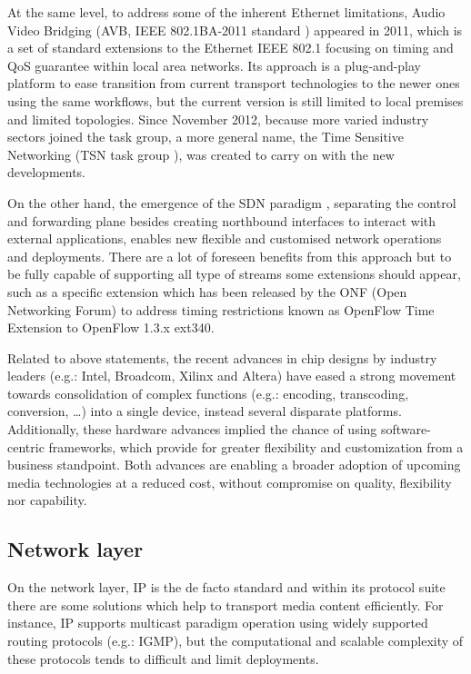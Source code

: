 At the same level, to address some of the inherent Ethernet limitations, Audio Video Bridging (AVB, IEEE 802.1BA-2011 standard \cite{avb}) appeared in 2011, which is a set of standard extensions to the Ethernet IEEE 802.1 \cite{8021} focusing on timing and QoS guarantee within local area networks. Its approach is a plug-and-play platform to ease transition from current transport technologies to the newer ones using the same workflows, but the current version is still limited to local premises and limited topologies. Since November 2012, because more varied industry sectors joined the task group, a more general name, the Time Sensitive Networking (TSN task group \cite{tsn}), was created to carry on with the new developments.

On the other hand, the emergence of the SDN paradigm \cite{sdn}, separating the control and forwarding plane besides creating northbound interfaces to interact with external applications, enables new flexible and customised network operations and deployments. There are a lot of foreseen benefits from this approach but to be fully capable of supporting all type of streams some extensions should appear, such as a specific extension which has been released by the ONF (Open Networking Forum) to address timing restrictions known as OpenFlow \cite{sdn} Time Extension to OpenFlow 1.3.x ext340.

Related to above statements, the recent advances in chip designs by industry leaders (e.g.: Intel, Broadcom, Xilinx and Altera) have eased a strong movement towards consolidation of complex functions (e.g.: encoding, transcoding, conversion, \ldots ) into a single device, instead several disparate platforms. Additionally, these hardware advances implied the chance of using software-centric frameworks, which provide for greater flexibility and customization from a business standpoint. Both advances are enabling a broader adoption of upcoming media technologies at a reduced cost, without compromise on quality, flexibility nor capability. 

\subsection{Network layer}

On the network layer, IP is the de facto standard and within its protocol suite there are some solutions which help to transport media content efficiently. For instance, IP supports multicast \cite{mc} paradigm operation using widely supported routing protocols (e.g.: IGMP), but the computational and scalable complexity of these protocols tends to difficult and limit deployments.

